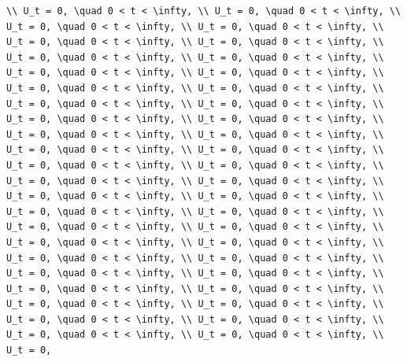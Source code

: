 \documentclass[
  ukrainian,
]{article}
\begin{document}
\begin{verbatim}
\\ U_t = 0, \quad 0 < t < \infty, \\ U_t = 0, \quad 0 < t < \infty, \\ U_t = 0, \quad 0 < t < \infty, \\ U_t = 0, \quad 0 < t < \infty, \\ U_t = 0, \quad 0 < t < \infty, \\ U_t = 0, \quad 0 < t < \infty, \\ U_t = 0, \quad 0 < t < \infty, \\ U_t = 0, \quad 0 < t < \infty, \\ U_t = 0, \quad 0 < t < \infty, \\ U_t = 0, \quad 0 < t < \infty, \\ U_t = 0, \quad 0 < t < \infty, \\ U_t = 0, \quad 0 < t < \infty, \\ U_t = 0, \quad 0 < t < \infty, \\ U_t = 0, \quad 0 < t < \infty, \\ U_t = 0, \quad 0 < t < \infty, \\ U_t = 0, \quad 0 < t < \infty, \\ U_t = 0, \quad 0 < t < \infty, \\ U_t = 0, \quad 0 < t < \infty, \\ U_t = 0, \quad 0 < t < \infty, \\ U_t = 0, \quad 0 < t < \infty, \\ U_t = 0, \quad 0 < t < \infty, \\ U_t = 0, \quad 0 < t < \infty, \\ U_t = 0, \quad 0 < t < \infty, \\ U_t = 0, \quad 0 < t < \infty, \\ U_t = 0, \quad 0 < t < \infty, \\ U_t = 0, \quad 0 < t < \infty, \\ U_t = 0, \quad 0 < t < \infty, \\ U_t = 0, \quad 0 < t < \infty, \\ U_t = 0, \quad 0 < t < \infty, \\ U_t = 0, \quad 0 < t < \infty, \\ U_t = 0, \quad 0 < t < \infty, \\ U_t = 0, \quad 0 < t < \infty, \\ U_t = 0, \quad 0 < t < \infty, \\ U_t = 0, \quad 0 < t < \infty, \\ U_t = 0, \quad 0 < t < \infty, \\ U_t = 0, \quad 0 < t < \infty, \\ U_t = 0, \quad 0 < t < \infty, \\ U_t = 0, \quad 0 < t < \infty, \\ U_t = 0, \quad 0 < t < \infty, \\ U_t = 0, \quad 0 < t < \infty, \\ U_t = 0, \quad 0 < t < \infty, \\ U_t = 0, \quad 0 < t < \infty, \\ U_t = 0, \quad 0 < t < \infty, \\ U_t = 0, \quad 0 < t < \infty, \\ U_t = 0, 
\end{verbatim}
\end{document}
